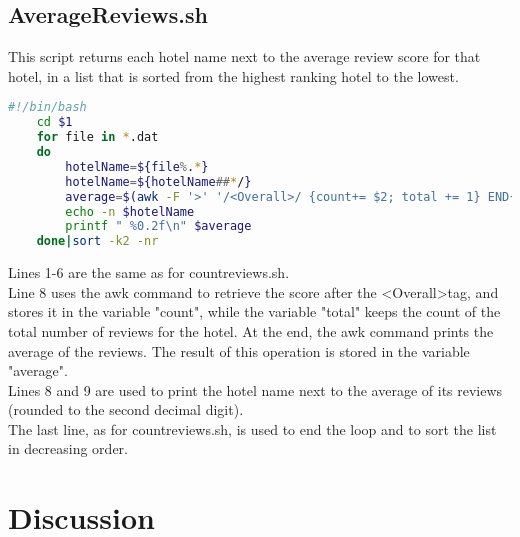 \documentclass{article}
\begin{document}
    \subsection{AverageReviews.sh}
	
	This script returns each hotel name next to the average review score for that hotel, in a list that is sorted from the highest ranking hotel to the lowest.
	
	\begin{lstlisting}[language=Bash]
    #!/bin/bash
    cd $1
    for file in *.dat
    do
	    hotelName=${file%.*}
	    hotelName=${hotelName##*/}
	    average=$(awk -F '>' '/<Overall>/ {count+= $2; total += 1} END{print count/total}' $file)
        echo -n $hotelName
        printf " %0.2f\n" $average
    done|sort -k2 -nr
    \end{lstlisting}
    
    Lines 1-6 are the same as for countreviews.sh.\\
    Line 8 uses the awk command to retrieve the score after the \textless Overall\textgreater tag, and stores it in the variable "count", while the variable "total" keeps the count of the total number of reviews for the hotel. At the end, the awk command prints the average of the reviews. The result of this operation is stored in the variable "average".\\
    Lines 8 and 9 are used to print the hotel name next to the average of its reviews (rounded to the second decimal digit).\\
    The last line, as for countreviews.sh, is used to end the loop and to sort the list in decreasing order.
	
	\section{Discussion}
	
\end{document}
